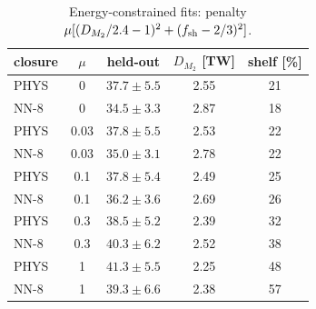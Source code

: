 \begin{table}[t]\centering\footnotesize
\caption{Energy-constrained fits: penalty $\mu[(D_{M_2}/2.4-1)^2+(f_{\rm sh}-2/3)^2]$.}
\label{tab:energy}
\begin{tabular}{lcccc}
\toprule
closure & $\mu$ & held-out & $D_{M_2}$ [TW] & shelf [\%] \\
\midrule
\textsc{PHYS} & 0 & $37.7\pm5.5$ & 2.55 & 21 \\
\textsc{NN-8} & 0 & $34.5\pm3.3$ & 2.87 & 18 \\
\textsc{PHYS} & 0.03 & $37.8\pm5.5$ & 2.53 & 22 \\
\textsc{NN-8} & 0.03 & $35.0\pm3.1$ & 2.78 & 22 \\
\textsc{PHYS} & 0.1 & $37.8\pm5.4$ & 2.49 & 25 \\
\textsc{NN-8} & 0.1 & $36.2\pm3.6$ & 2.69 & 26 \\
\textsc{PHYS} & 0.3 & $38.5\pm5.2$ & 2.39 & 32 \\
\textsc{NN-8} & 0.3 & $40.3\pm6.2$ & 2.52 & 38 \\
\textsc{PHYS} & 1 & $41.3\pm5.5$ & 2.25 & 48 \\
\textsc{NN-8} & 1 & $39.3\pm6.6$ & 2.38 & 57 \\
\bottomrule
\end{tabular}
\end{table}
